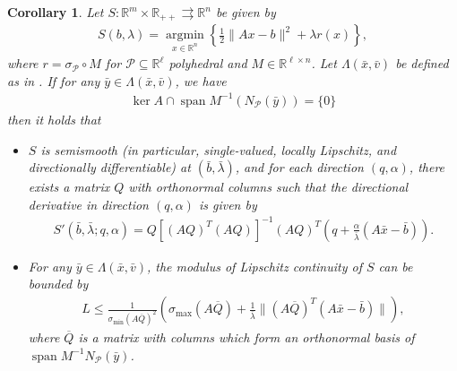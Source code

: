 \documentclass[reqno]{amsart}
\newtheorem{corollary}[proposition]{Corollary}
\numberwithin{equation}{section}
\newcommand{\R}{\mathbb{R}}
\newcommand{\pol}{\mathcal{P}}
\newcommand{\x}{\bar{x}}
\newcommand{\argmin}{\operatorname{argmin}}
\begin{document}
\begin{corollary}\label{cor:polyhedraldd}
    Let $S : \R^m \times \R_{++} \rightrightarrows \R^n$ be given by
    \begin{align*}
        S(b, \lambda) = \underset{x \in \R^n}{\argmin} \left\{ \frac{1}{2} \lVert Ax - b \rVert^2 + \lambda r(x) \right\},
    \end{align*} where $r = \sigma_{\pol} \circ M$ for $\pol \subseteq \R^{\ell}$ polyhedral and $M \in \R^{\ell \times n}$.
    Let $\Lambda(\x, \bar v)$ be defined as in .
    If for any $\bar y \in \Lambda(\x, \bar v)$, we have
    \begin{align}\label{eq:MordCritpolyhedral}
        \ker A \cap \operatorname{span} M^{-1} (N_{\pol}(\bar{y})) = \{0\}
    \end{align} then it holds that
    \begin{itemize}
        \item[(a)] $S$ is semismooth (in particular, single-valued, locally Lipschitz, and directionally differentiable) at $(\bar{b}, \bar{\lambda})$, and for each direction $(q, \alpha)$, there exists a matrix $Q$ with orthonormal columns such that the directional derivative in direction $(q, \alpha)$ is given by 
        \begin{align*}
            S'(\bar{b}, \bar{\lambda} ; q, \alpha) = Q[(AQ)^T(AQ)]^{-1} (AQ)^T \left(q + \frac{\alpha}{\bar{\lambda}}(A \x - \bar{b})\right).
        \end{align*}
        \item[(b)] For any $\bar{y} \in \Lambda(\x, \bar v)$, the modulus of Lipschitz continuity of $S$ can be bounded by
        \begin{align*}
            L \le \frac{1}{\sigma_{\min}(A \overline{Q})^2}
            \left( \sigma_{\max}(A \overline{Q}) + \frac{1}{\bar{\lambda}} \lVert (A\overline{Q})^T(A \x - \bar{b}) \rVert \right),
        \end{align*} where $\overline{Q}$ is a matrix with columns which
        form an orthonormal basis of $\operatorname{span} M^{-1} N_{\pol}(\bar{y})$.
    \end{itemize}
\end{corollary}
\end{document}
